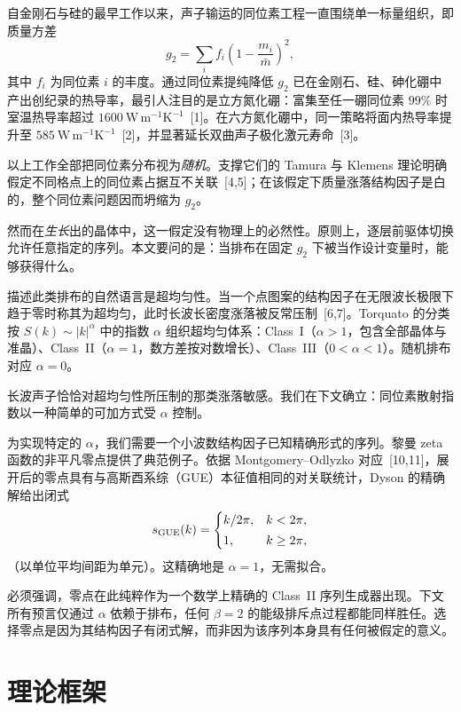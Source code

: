 \documentclass[10pt,twocolumn]{article}
\begin{document}
自金刚石与硅的最早工作以来，声子输运的同位素工程一直围绕单一标量组织，即质量方差
\begin{equation}
  g_2 = \sum_i f_i\left(1-\frac{m_i}{\bar m}\right)^{\!2},
  \label{eq:g2}
\end{equation}
其中 $f_i$ 为同位素 $i$ 的丰度。通过同位素提纯降低 $g_2$ 已在金刚石、硅、砷化硼中产出创纪录的热导率，最引人注目的是立方氮化硼：富集至任一硼同位素 $99\%$ 时室温热导率超过 $1600~\mathrm{W\,m^{-1}K^{-1}}$~[1]。在六方氮化硼中，同一策略将面内热导率提升至 $585~\mathrm{W\,m^{-1}K^{-1}}$~[2]，并显著延长双曲声子极化激元寿命~[3]。

以上工作全部把同位素分布视为\emph{随机}。支撑它们的 Tamura 与 Klemens 理论明确假定不同格点上的同位素占据互不关联~[4,5]；在该假定下质量涨落结构因子是白的，整个同位素问题因而坍缩为 $g_2$。

然而在\emph{生长}出的晶体中，这一假定没有物理上的必然性。原则上，逐层前驱体切换允许任意指定的序列。本文要问的是：当排布在固定 $g_2$ 下被当作设计变量时，能够获得什么。

描述此类排布的自然语言是超均匀性。当一个点图案的结构因子在无限波长极限下趋于零时称其为超均匀，此时长波长密度涨落被反常压制~[6,7]。Torquato 的分类按 $S(k)\sim|k|^\alpha$ 中的指数 $\alpha$ 组织超均匀体系：Class~I（$\alpha>1$，包含全部晶体与准晶）、Class~II（$\alpha=1$，数方差按对数增长）、Class~III（$0<\alpha<1$）。随机排布对应 $\alpha=0$。

长波声子恰恰对超均匀性所压制的那类涨落敏感。我们在下文确立：同位素散射指数以一种简单的可加方式受 $\alpha$ 控制。

为实现特定的 $\alpha$，我们需要一个小波数结构因子已知精确形式的序列。黎曼 zeta 函数的非平凡零点提供了典范例子。依据 Montgomery--Odlyzko 对应~[10,11]，展开后的零点具有与高斯酉系综（GUE）本征值相同的对关联统计，Dyson 的精确解给出闭式
\begin{equation}
  s_{\rm GUE}(k)=
  \begin{cases}
    k/2\pi, & k<2\pi,\\[2pt]
    1,      & k\ge 2\pi,
  \end{cases}
  \label{eq:sgue}
\end{equation}
（以单位平均间距为单元）。这精确地是 $\alpha=1$，无需拟合。

必须强调，零点在此纯粹作为一个数学上精确的 Class~II 序列生成器出现。下文所有预言仅通过 $\alpha$ 依赖于排布，任何 $\beta=2$ 的能级排斥点过程都能同样胜任。选择零点是因为其结构因子有闭式解，而非因为该序列本身具有任何被假定的意义。

\section{理论框架}
\label{sec:theory}
\end{document}
